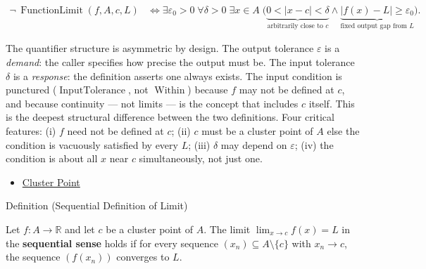 \begin{remark*}
\[
\begin{aligned}
  \neg\,\operatorname{FunctionLimit}(f,A,c,L)
  &\Longleftrightarrow
  \exists \varepsilon_0>0\;
  \forall \delta>0\;
  \exists x\in A\;
  \bigl(
    \underbrace{0<|x-c|<\delta}_{\text{arbitrarily close to }c}
    \wedge
    \underbrace{|f(x)-L|\geq\varepsilon_0}_{\text{fixed output gap from }L}
  \bigr).
\end{aligned}
\]
\end{remark*}

\begin{remark*}[Interpretation]
The quantifier structure is asymmetric by design. The output
tolerance $\varepsilon$ is a \emph{demand}: the caller specifies how
precise the output must be. The input tolerance $\delta$ is a
\emph{response}: the definition asserts one always exists. The input
condition is punctured ($\operatorname{InputTolerance}$, not
$\operatorname{Within}$) because $f$ may not be defined at $c$, and
because continuity --- not limits --- is the concept that includes $c$
itself. This is the deepest structural difference between the two
definitions. Four critical features: (i) $f$ need not be defined at
$c$; (ii) $c$ must be a cluster point of $A$ else the condition is
vacuously satisfied by every $L$; (iii) $\delta$ may depend on
$\varepsilon$; (iv) the condition is about all $x$ near $c$
simultaneously, not just one.
\end{remark*}

\begin{dependencies}
\begin{itemize}
  \item \hyperref[def:cluster-point-r]{Cluster Point}
\end{itemize}
\end{dependencies}


\begin{definitionbox}{Definition (Sequential Definition of Limit)}
\begin{definition}
\label{def:limit-function-sequential}
Let $f : A \to \mathbb{R}$ and let $c$ be a cluster point of $A$.
The limit $\lim_{x \to c} f(x) = L$ in the \textbf{sequential
sense} holds if for every sequence $(x_n) \subseteq A \setminus \{c\}$
with $x_n \to c$, the sequence $(f(x_n))$ converges to $L$.
\end{definition}
\end{definitionbox}

